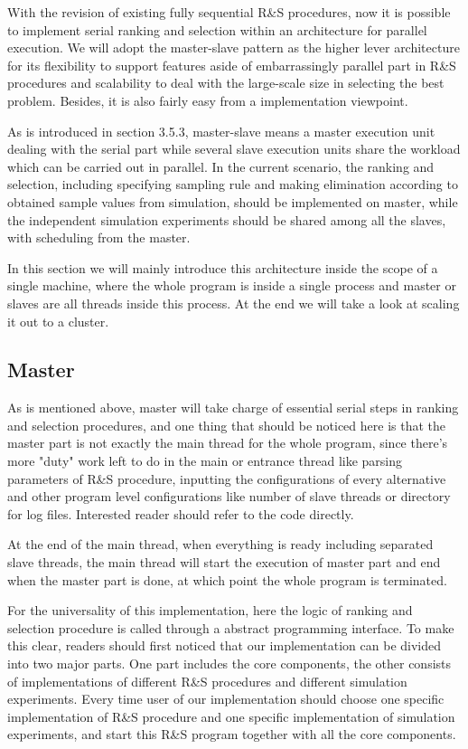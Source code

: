 \documentclass[12pt,a4]{report}
\begin{document}
With the revision of existing fully sequential R\&S procedures, now it is possible to implement serial ranking and selection within an architecture for parallel execution. We will adopt the master-slave pattern as the higher lever architecture for its flexibility to support features aside of embarrassingly parallel part in R\&S procedures and scalability to deal with the large-scale size in selecting the best problem. Besides, it is also fairly easy from a implementation viewpoint.

As is introduced in section 3.5.3, master-slave means a master execution unit dealing with the serial part while several slave execution units share the workload which can be carried out in parallel. In the current scenario, the ranking and selection, including specifying sampling rule and making elimination according to obtained sample values from simulation, should be implemented on master, while the independent simulation experiments should be shared among all the slaves, with scheduling from the master.

In this section we will mainly introduce this architecture inside the scope of a single machine, where the whole program is inside a single process and master or slaves are all threads inside this process. At the end we will take a look at scaling it out to a cluster.

\subsection{Master}

As is mentioned above, master will take charge of essential serial steps in ranking and selection procedures, and one thing that should be noticed here is that the master part is not exactly the main thread for the whole program, since there's more "duty" work left to do in the main or entrance thread like parsing parameters of R\&S procedure, inputting the configurations of every alternative and other program level configurations like number of slave threads or directory for log files. Interested reader should refer to the code directly.

At the end of the main thread, when everything is ready including separated slave threads, the main thread will start the execution of master part and end when the master part is done, at which point the whole program is terminated.

For the universality of this implementation, here the logic of ranking and selection procedure is called through a abstract programming interface. To make this clear, readers should first noticed that our implementation can be divided into two major parts. One part includes the core components, the other consists of implementations of different R\&S procedures and different simulation experiments. Every time user of our implementation should choose one specific implementation of R\&S procedure and one specific implementation of simulation experiments, and start this R\&S program together with all the core components.
\end{document}
